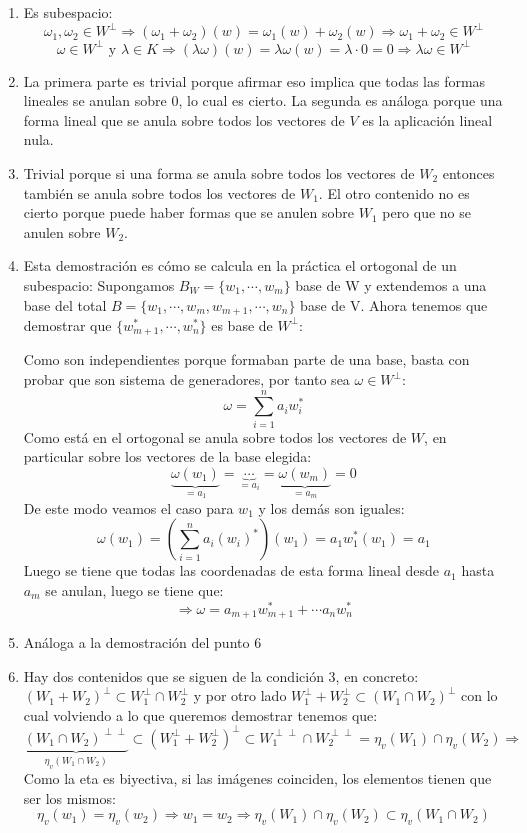 \documentclass[10pt,a4paper,openright]{book}
\begin{document}
\begin{enumerate}
\item Es subespacio:
$$\omega_1,\omega_2\in W^\perp \Rightarrow (\omega_1+\omega_2)(w)=\omega_1(w)+\omega_2(w)\Rightarrow \omega_1+\omega_2\in W^\perp$$
$$\omega \in W^\perp \mbox{ y }\lambda \in K \Rightarrow (\lambda \omega)(w)=\lambda \omega(w)=\lambda \cdot 0=0\Rightarrow \lambda\omega\in W^\perp$$

\item La primera parte es trivial porque afirmar eso implica que todas las formas lineales se anulan sobre 0, lo cual es cierto. La segunda es análoga porque una forma lineal que se anula sobre todos los vectores de $V$ es la aplicación lineal nula.

\item Trivial porque si una forma se anula sobre todos los vectores de $W_2$ entonces también se anula sobre todos los vectores de $W_1$. El otro contenido no es cierto porque puede haber formas que se anulen sobre $W_1$ pero que no se anulen sobre $W_2$.

\item Esta demostración es cómo se calcula en la práctica el ortogonal de un subespacio:
Supongamos $B_W=\{w_1, \cdots , w_m\}$ base de W y extendemos a una base del total $B=\{w_1, \cdots , w_m, w_{m+1}, \cdots, w_n\}$ base de V. Ahora tenemos que demostrar que $\{w_{m+1}^*, \cdots, w_n^*\}$ es base de $W^\perp$:

Como son independientes porque formaban parte de una base, basta con probar que son sistema de generadores, por tanto sea $\omega \in W^\perp$:
$$\omega = \sum_{i=1}^n a_iw_i^*$$
Como está en el ortogonal se anula sobre todos los vectores de $W$, en particular sobre los vectores de la base elegida:
$$\underbrace{\omega(w_1)}_{=a_1}=\underbrace{\cdots}_{=a_i} = \underbrace{\omega(w_m)}_{=a_m}=0$$
De este modo veamos el caso para $w_1$ y los demás son iguales:
$$\omega(w_1)=\left(\sum_{i=1}^n a_i(w_i)^*\right)(w_1)=a_1w_1^*(w_1)=a_1$$
Luego se tiene que todas las coordenadas de esta forma lineal desde $a_1$ hasta $a_m$ se anulan, luego se tiene que:
$$\Rightarrow \omega = a_{m+1}w_{m+1}^*+\cdots a_nw_n^*$$

\item Análoga a la demostración del punto 6

\item Hay dos contenidos que se siguen de la condición 3, en concreto: $(W_1+W_2)^\perp \subset W_1^\perp \cap W_2^\perp$ y por otro lado $W_1^\perp+W_2^\perp\subset (W_1\cap W_2)^\perp$ con lo cual volviendo a lo que queremos demostrar tenemos que:
$$\underbrace{(W_1\cap W_2)^{\perp\perp}}_{\eta_v(W_1\cap W_2)}\subset (W_1^\perp + W_2^\perp)^\perp\subset W_1^{\perp\perp}\cap W_2^{\perp\perp}=\eta_v(W_1)\cap \eta_v(W_2)\Rightarrow $$
Como la eta es biyectiva, si las imágenes coinciden, los elementos tienen que ser los mismos:
$$\eta_v(w_1)=\eta_v(w_2)\Rightarrow w_1=w_2\Rightarrow \eta_v(W_1)\cap \eta_v(W_2) \subset \eta_v(W_1\cap W_2)$$


\end{enumerate}
\end{document}
